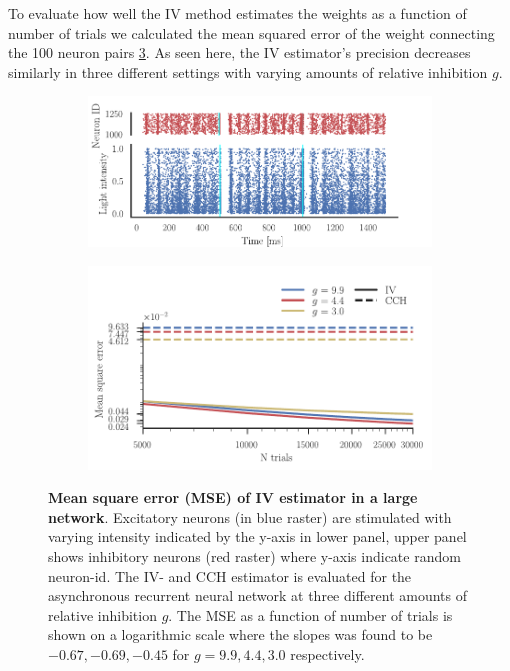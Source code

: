 \documentclass[11pt]{article}
\begin{document}
To evaluate how well the IV method estimates the weights as a function of number of trials we calculated the mean squared error of the weight connecting the 100 neuron pairs \cref{fig:error}. As seen here, the IV estimator's precision decreases similarly in three different settings with varying amounts of relative inhibition $ g $.
\begin{figure}
\makeatletter
\renewcommand\p@subfigure{}
\makeatother
\begin{subfigure}{\textwidth} 
\includegraphics[scale=1]{network-raster}
\caption{} \label{fig:error:raster}
\end{subfigure}\medskip

\begin{subfigure}{\textwidth} 
\includegraphics[scale=1]{mse}
\caption{} \label{fig:error:mse}
\end{subfigure}
\caption{{\bf Mean square error (MSE) of IV estimator in a large network}.  Excitatory neurons (in blue raster) are stimulated with varying intensity indicated by the y-axis in lower panel, upper panel shows inhibitory neurons (red raster) where y-axis indicate random neuron-id.  The IV- and CCH estimator is evaluated for the asynchronous recurrent neural network at three different amounts of relative inhibition $ g $. The MSE as a function of number of trials is shown on a logarithmic scale where the slopes was found to be $ -0.67, -0.69, -0.45 $ for $g = 9.9, 4.4, 3.0$ respectively. \label{fig:error}}
\end{figure}
\end{document}
